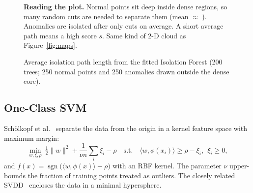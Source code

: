 \documentclass[11pt,a4paper]{article}
\begin{document}
\begin{figure}[H]
\centering
\begin{minipage}{0.6\textwidth}
\centering
{}
\end{minipage}\hfill
\begin{minipage}{0.36\textwidth}
\small\textbf{Reading the plot.} Normal points sit deep inside dense regions, so many random cuts are
needed to separate them (mean $\approx$ \pathNormal). Anomalies are isolated after only \pathAnom{} cuts on
average. A short average path means a high score $s$. Same kind of 2-D cloud as Figure~\ref{fig:maps}.
\end{minipage}
\caption{Average isolation path length from the fitted Isolation Forest (200 trees; 250 normal points and
250 anomalies drawn outside the dense core).}
\label{fig:pathlen}
\end{figure}

\subsection{One-Class SVM}
Schölkopf et al.~\cite{ocsvm} separate the data from the origin in a kernel feature space with maximum margin:
\begin{equation}
  \min_{w,\xi,\rho}\ \tfrac12\lVert w\rVert^2+\frac{1}{\nu n}\sum_i\xi_i-\rho
  \quad\text{s.t.}\quad \langle w,\phi(x_i)\rangle\ge\rho-\xi_i,\ \ \xi_i\ge0,
\end{equation}
and $f(x)=\operatorname{sgn}\bigl(\langle w,\phi(x)\rangle-\rho\bigr)$ with an RBF kernel. The parameter $\nu$
upper-bounds the fraction of training points treated as outliers. The closely related SVDD~\cite{svdd}
encloses the data in a minimal hypersphere.
\end{document}
